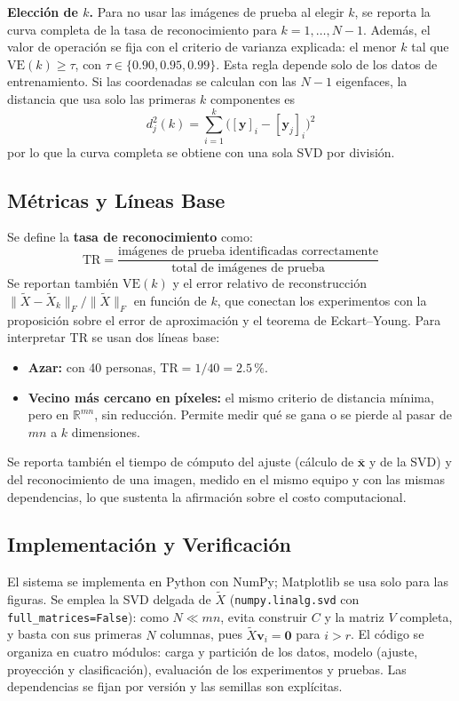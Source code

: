 \textbf{Elección de $k$.} Para no usar las imágenes de prueba al elegir $k$, se reporta la
curva completa de la tasa de reconocimiento para $k = 1, \dots, N-1$. Además, el valor de
operación se fija con el criterio de varianza explicada: el menor $k$ tal que
$\text{VE}(k) \geq \tau$, con $\tau \in \{0.90, 0.95, 0.99\}$.
Esta regla depende solo de los datos de entrenamiento. Si las coordenadas se calculan con
las $N-1$ eigenfaces, la distancia que usa solo las primeras $k$ componentes es
\[
d_j^2(k) = \sum_{i=1}^{k}\big([\mathbf{y}]_i - [\mathbf{y}_j]_i\big)^2
\]
por lo que la curva completa se obtiene con una sola SVD por división.


\subsection{Métricas y Líneas Base}

Se define la \textbf{tasa de reconocimiento} como:
\[
\text{TR} = \frac{\text{imágenes de prueba identificadas correctamente}}
{\text{total de imágenes de prueba}}
\]
Se reportan también $\text{VE}(k)$ y el error relativo de reconstrucción
$\|\tilde{X} - \tilde{X}_k\|_F / \|\tilde{X}\|_F$ en función de $k$, que conectan los
experimentos con la proposición sobre el error de aproximación y el teorema de
Eckart--Young. Para interpretar $\text{TR}$ se usan dos líneas base:
\begin{itemize}
    \item \textbf{Azar:} con 40 personas, $\text{TR} = 1/40 = 2.5\,\%$.
    \item \textbf{Vecino más cercano en píxeles:} el mismo criterio de distancia mínima,
    pero en $\mathbb{R}^{mn}$, sin reducción. Permite medir qué se gana o se pierde al
    pasar de $mn$ a $k$ dimensiones.
\end{itemize}

Se reporta también el tiempo de cómputo del ajuste (cálculo de $\bar{\mathbf{x}}$ y de
la SVD) y del reconocimiento de una imagen, medido en el mismo equipo y con las mismas
dependencias, lo que sustenta la afirmación sobre el costo computacional.


\subsection{Implementación y Verificación}

El sistema se implementa en Python con NumPy; Matplotlib se usa solo para las figuras. Se
emplea la SVD delgada de $\tilde{X}$ (\texttt{numpy.linalg.svd} con
\texttt{full\_matrices=False}): como $N \ll mn$, evita construir $C$ y la matriz $V$
completa, y basta con sus primeras $N$ columnas, pues $\tilde{X}\mathbf{v}_i = \mathbf{0}$
para $i > r$. El código se organiza en cuatro módulos: carga y partición de los datos,
modelo (ajuste, proyección y clasificación), evaluación de los experimentos y pruebas.
Las dependencias se fijan por versión y las semillas son explícitas.


